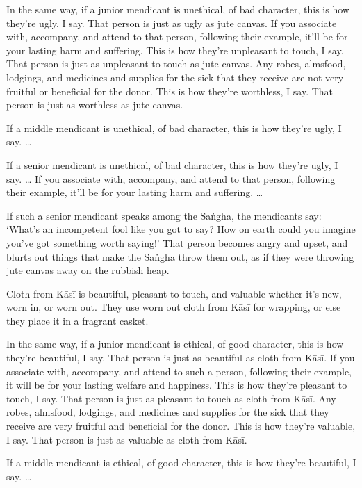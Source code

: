\documentclass[12pt,openany]{book}%
\begin{document}
In the same way, if a junior mendicant is unethical, of bad character, this is how they’re ugly, I say. That person is just as ugly as jute canvas. If you associate with, accompany, and attend to that person, following their example, it’ll be for your lasting harm and suffering. This is how they’re unpleasant to touch, I say. That person is just as unpleasant to touch as jute canvas. Any robes, almsfood, lodgings, and medicines and supplies for the sick that they receive are not very fruitful or beneficial for the donor. This is how they’re worthless, I say. That person is just as worthless as jute canvas. 

If a middle mendicant is unethical, of bad character, this is how they’re ugly, I say. … 

If a senior mendicant is unethical, of bad character, this is how they’re ugly, I say. … If you associate with, accompany, and attend to that person, following their example, it’ll be for your lasting harm and suffering. … 

If such a senior mendicant speaks among the \textsanskrit{Saṅgha}, the mendicants say: ‘What’s an incompetent fool like you got to say? How on earth could you imagine you’ve got something worth saying!’ That person becomes angry and upset, and blurts out things that make the \textsanskrit{Saṅgha} throw them out, as if they were throwing jute canvas away on the rubbish heap. 

Cloth from \textsanskrit{Kāsī} is beautiful, pleasant to touch, and valuable whether it’s new, worn in, or worn out. They use worn out cloth from \textsanskrit{Kāsī} for wrapping, or else they place it in a fragrant casket. 

In the same way, if a junior mendicant is ethical, of good character, this is how they’re beautiful, I say. That person is just as beautiful as cloth from \textsanskrit{Kāsī}. If you associate with, accompany, and attend to such a person, following their example, it will be for your lasting welfare and happiness. This is how they’re pleasant to touch, I say. That person is just as pleasant to touch as cloth from \textsanskrit{Kāsī}. Any robes, almsfood, lodgings, and medicines and supplies for the sick that they receive are very fruitful and beneficial for the donor. This is how they’re valuable, I say. That person is just as valuable as cloth from \textsanskrit{Kāsī}. 

If a middle mendicant is ethical, of good character, this is how they’re beautiful, I say. … 
\end{document}
